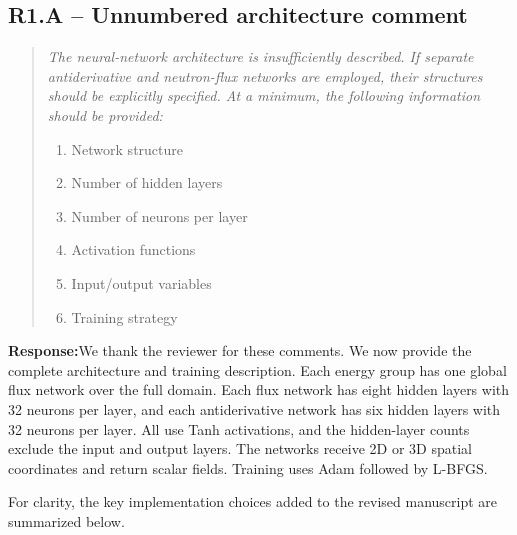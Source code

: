 \documentclass[11pt,a4paper]{article}
\newenvironment{reviewercomment}{\begin{quote}\small\itshape\color{commentgray}}{\end{quote}}
\newcommand{\authorresponse}{\noindent\textbf{Response:}\quad}
\begin{document}
\subsection*{R1.A -- Unnumbered architecture comment}
\begin{reviewercomment}
The neural-network architecture is insufficiently described. If separate antiderivative and neutron-flux networks are employed, their structures should be explicitly specified. At a minimum, the following information should be provided:
\begin{enumerate}[label=\alph*.,leftmargin=2em]
\item Network structure
\item Number of hidden layers
\item Number of neurons per layer
\item Activation functions
\item Input/output variables
\item Training strategy
\end{enumerate}
\end{reviewercomment}
\authorresponse We thank the reviewer for these comments. We now provide the complete architecture and training description. Each energy group has one global flux network over the full domain. Each flux network has eight hidden layers with 32 neurons per layer, and each antiderivative network has six hidden layers with 32 neurons per layer. All use Tanh activations, and the hidden-layer counts exclude the input and output layers. The networks receive 2D or 3D spatial coordinates and return scalar fields. Training uses Adam followed by L-BFGS.

For clarity, the key implementation choices added to the revised manuscript are summarized below.
\end{document}
